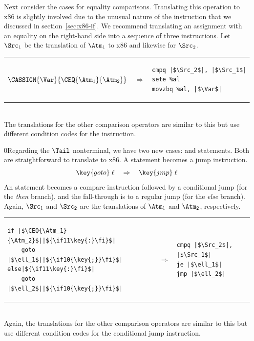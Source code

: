 \documentclass[7x10]{TimesAPriori_MIT}%
\def\racketEd{0}
\def\pythonEd{1}
\providecommand{\BookEdition}{1}
\let\edition\BookEdition
\newcommand{\racket}[1]{{\if\edition\racketEd{#1}\fi}}
\newcommand{\pythonColor}[0]{}
\newcommand{\python}[1]{{\if\edition\pythonEd\pythonColor #1\fi}}
\numberwithin{theorem}{chapter}
\numberwithin{definition}{chapter}
\numberwithin{equation}{chapter}
\begin{document}
Next consider the cases for equality comparisons.  Translating this
operation to x86 is slightly involved due to the unusual nature of the
 instruction that we discussed in section~\ref{sec:x86-if}.
We recommend translating an assignment with an equality on the
right-hand side into a sequence of three instructions. Let $\Src_1$
be the translation of $\Atm_1$ to x86 and likewise for $\Src_2$.\\
\begin{tabular}{lll}
\begin{minipage}{0.4\textwidth}
$\CASSIGN{\Var}{ \CEQ{\Atm_1}{\Atm_2} }$ 
\end{minipage}
&
$\Rightarrow$
&
\begin{minipage}{0.4\textwidth}
\begin{lstlisting}
cmpq |$\Src_2$|, |$\Src_1$|
sete %al
movzbq %al, |$\Var$|
\end{lstlisting}
\end{minipage}
\end{tabular}  \\
The translations for the other comparison operators are similar to
this but use different condition codes for the  instruction.

\racket{Regarding the $\Tail$ nonterminal, we have two new cases:
  \key{goto} and \key{if} statements. Both are straightforward to
  translate to x86.}
%
A  statement becomes a jump instruction.
\[
\key{goto}\; \ell\racket{\key{;}} \quad \Rightarrow \quad \key{jmp}\;\ell
\]
%
An  statement becomes a compare instruction followed by a
conditional jump (for the \emph{then} branch), and the fall-through is to
a regular jump (for the \emph{else} branch). Again, $\Src_1$ and $\Src_2$
are the translations of $\Atm_1$ and $\Atm_2$, respectively.\\
\begin{tabular}{lll}
\begin{minipage}{0.4\textwidth}
\begin{lstlisting}
if |$\CEQ{\Atm_1}{\Atm_2}$||$\python{\key{:}}$|
    goto |$\ell_1$||$\racket{\key{;}}$|
else|$\python{\key{:}}$|
    goto |$\ell_2$||$\racket{\key{;}}$|
\end{lstlisting}
\end{minipage}
&
$\Rightarrow$
&
\begin{minipage}{0.4\textwidth}
\begin{lstlisting}
cmpq |$\Src_2$|, |$\Src_1$|
je |$\ell_1$|
jmp |$\ell_2$|
\end{lstlisting}
\end{minipage}
\end{tabular}  \\
Again, the translations for the other comparison operators are similar to this
but use different condition codes for the conditional jump instruction.
\end{document}
